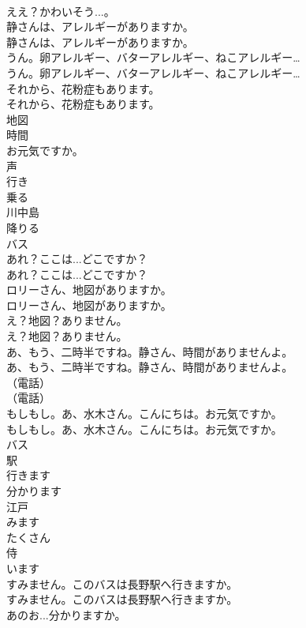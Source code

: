 \documentclass[8pt]{extreport}
\begin{document}
\begin{CJK}{UTF8}{min}
\\	ええ？かわいそう...。 
\\	静さんは、アレルギーがありますか。	
\\	静さんは、アレルギーがありますか。 
\\	うん。卵アレルギー、バターアレルギー、ねこアレルギー…	
\\	うん。卵アレルギー、バターアレルギー、ねこアレルギー… 
\\	それから、花粉症もあります。	
\\	それから、花粉症もあります。 
\\	地図
\\	時間
\\	お元気ですか。
\\	声
\\	行き
\\	乗る
\\	川中島
\\	降りる
\\	バス
\\	あれ？ここは...どこですか？	
\\	あれ？ここは...どこですか？ 
\\	ロリーさん、地図がありますか。	
\\	ロリーさん、地図がありますか。 
\\	え？地図？ありません。	
\\	え？地図？ありません。 
\\	あ、もう、二時半ですね。静さん、時間がありませんよ。	
\\	あ、もう、二時半ですね。静さん、時間がありませんよ。 
\\	（電話）	
\\	（電話） 
\\	もしもし。あ、水木さん。こんにちは。お元気ですか。	
\\	もしもし。あ、水木さん。こんにちは。お元気ですか。 
\\	バス
\\	駅
\\	行きます
\\	分かります
\\	江戸
\\	みます
\\	たくさん
\\	侍
\\	います
\\	すみません。このバスは長野駅へ行きますか。	
\\	すみません。このバスは長野駅へ行きますか。 
\\	あのお...分かりますか。	

\end{CJK}
\end{document}
